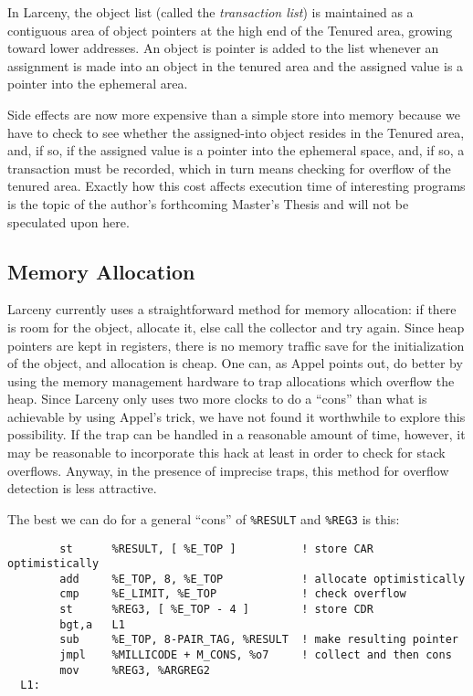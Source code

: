 In Larceny, the object list (called the {\em transaction list}) is
maintained as a contiguous area of object pointers at the high end of the
Tenured area, growing toward lower addresses. An object is pointer is added
to the list whenever an assignment is made into an object in the tenured
area and the assigned value is a pointer into the ephemeral area.

Side effects are now more expensive than a simple store into memory because
we have to check to see whether the assigned-into object resides in the
Tenured area, and, if so, if the assigned value is a pointer into the
ephemeral space, and, if so, a transaction must be recorded, which in turn
means checking for overflow of the tenured area.  Exactly how this cost
affects execution time of interesting programs is the topic of the author's
forthcoming Master's Thesis and will not be speculated upon here.

\subsection{Memory Allocation}

Larceny currently uses a straightforward method for memory allocation: if
there is room for the object, allocate it, else call the collector and
try again. Since heap pointers are kept in registers, there is no memory
traffic save for the initialization of the object, and allocation is cheap.
One can, as Appel\cite{Appel} points out, do better by using the memory
management hardware to trap allocations which overflow the heap. Since
Larceny only uses two more clocks to do a ``cons'' than what is achievable
by using Appel's trick, we have not found it worthwhile to explore this
possibility. If the trap can be handled in a reasonable amount of time,
however, it may be reasonable to incorporate this hack at least in order
to check for stack overflows. Anyway, in the presence of imprecise traps,
this method for overflow detection is less attractive\cite{AppelLi}.

The best we can do for a general ``cons'' of {\tt \%RESULT} and {\tt \%REG3}
is this:

\begin{minipage}{\linewidth}
\begin{verbatim}
        st      %RESULT, [ %E_TOP ]          ! store CAR optimistically
        add     %E_TOP, 8, %E_TOP            ! allocate optimistically
        cmp     %E_LIMIT, %E_TOP             ! check overflow
        st      %REG3, [ %E_TOP - 4 ]        ! store CDR
        bgt,a   L1
        sub     %E_TOP, 8-PAIR_TAG, %RESULT  ! make resulting pointer
        jmpl    %MILLICODE + M_CONS, %o7     ! collect and then cons
        mov     %REG3, %ARGREG2
  L1:
\end{verbatim}
\end{minipage}

